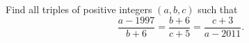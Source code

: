 Find all triples of positive integers $(a,b,c)$ such that
\[\dfrac{a-1997}{b+6}=\dfrac{b+6}{c+5}=\dfrac{c+3}{a-2011}.\]

